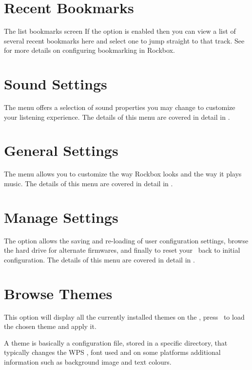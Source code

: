 \section {Recent Bookmarks}
%
  {The list bookmarks screen}{}
If the  option is enabled 
then you can view a list of several recent bookmarks here and select one to 
jump straight to that track. See  
for more details on configuring bookmarking in Rockbox.

\section{Sound Settings}
The  menu offers a selection of sound properties you may 
change to customize your listening experience.  The details of this menu are 
covered in detail in . 

\section{General Settings}
The  menu allows you to customize the way Rockbox looks 
and the way it plays music.  The details of this menu are covered in detail in 
.

\section{Manage Settings}
The  option allows the saving and re-loading of user 
configuration settings, browse the hard drive for alternate firmwares, and finally
to reset your \dap\ back to initial configuration. The details of this menu are 
covered in detail in .

\section{Browse Themes}
This option will display all the currently installed themes on the \dap, 
press \ButtonRight\ to load the chosen theme and apply it.

A theme is basically a configuration file, stored in a specific directory, 
that typically changes the WPS 
, font used and on some platforms
additional information such as background image and text colours.

